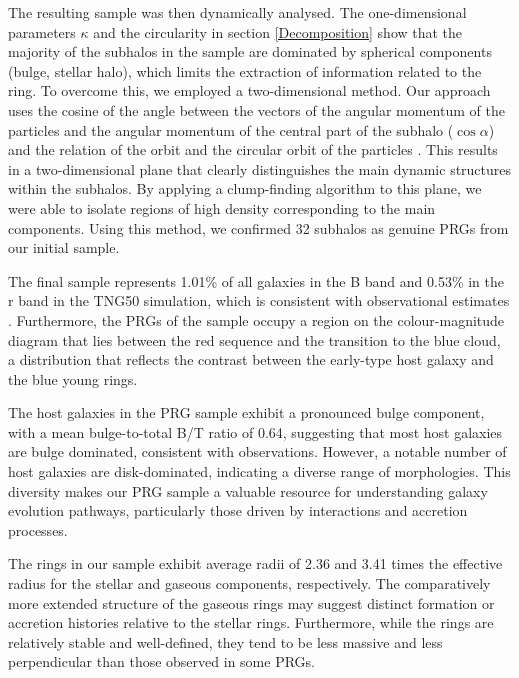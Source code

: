 \documentclass[fleqn,usenatbib]{mnras}
\begin{document}
The resulting sample was then dynamically analysed. The one-dimensional parameters $\kappa$ \citep{Sales_2012} and the circularity \citep[$\epsilon$]{Abadi_2003} in section \ref{Decomposition} show that the majority of the subhalos in the sample are dominated by spherical components (bulge, stellar halo), which limits the extraction of information related to the ring. To overcome this, we employed a two-dimensional method. Our approach uses the cosine of the angle between the vectors of the angular momentum of the particles and the angular momentum of the central part of the subhalo ($\cos{\alpha}$) and the relation of the orbit and the circular orbit of the particles \citep{jagvaral_probabilistic_2021}. This results in a two-dimensional plane that clearly distinguishes the main dynamic structures within the subhalos. By applying a clump-finding algorithm to this plane, we were able to isolate regions of high density corresponding to the main components. Using this method, we confirmed 32 subhalos as genuine PRGs from our initial sample.

The final sample represents 1.01\% of all galaxies in the B band and 0.53\% in the r band in the TNG50 simulation, which is consistent with observational estimates \citep{1990_Whitmore, 2011_Reshetnikov, 2022_Smirnov, 2024_Mosenkov}. Furthermore, the PRGs of the sample occupy a region on the colour-magnitude diagram that lies between the red sequence and the transition to the blue cloud, a distribution that reflects the contrast between the early-type host galaxy and the blue young rings.  

The host galaxies in the PRG sample exhibit a pronounced bulge component, with a mean bulge-to-total B/T ratio of 0.64, suggesting that most host galaxies are bulge dominated, consistent with observations. However, a notable number of host galaxies are disk-dominated, indicating a diverse range of morphologies. This diversity makes our PRG sample a valuable resource for understanding galaxy evolution pathways, particularly those driven by interactions and accretion processes.

The rings in our sample exhibit average radii of 2.36 and 3.41 times the effective radius for the stellar and gaseous components, respectively. The comparatively more extended structure of the gaseous rings may suggest distinct formation or accretion histories relative to the stellar rings. Furthermore, while the rings are relatively stable and well-defined, they tend to be less massive and less perpendicular than those observed in some PRGs.
\end{document}
